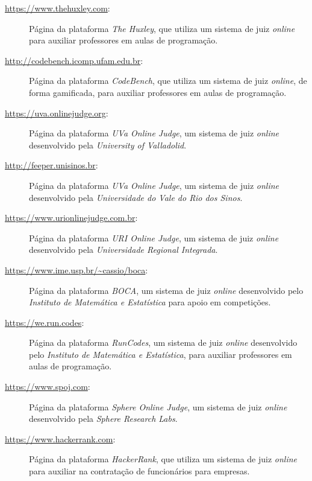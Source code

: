 \begin{description}
\label{link:the_huxley}
  \item[\url{https://www.thehuxley.com}:]  Página da plataforma \emph{The Huxley}, 
    que utiliza um sistema de juiz \emph{online} para auxiliar professores em aulas de programação.

\label{link:code_bench}
  \item[\url{http://codebench.icomp.ufam.edu.br}:]  Página da plataforma \emph{CodeBench}, 
    que utiliza um sistema de juiz \emph{online}, de forma gamificada, para auxiliar professores em aulas de programação.

\label{link:uva_judge}
  \item[\url{https://uva.onlinejudge.org}:] Página da plataforma \emph{UVa Online Judge}, um sistema
    de juiz \emph{online} desenvolvido pela \emph{University of Valladolid}.

\label{link:feeper}
  \item[\url{http://feeper.unisinos.br}:] Página da plataforma \emph{UVa Online Judge}, um sistema
    de juiz \emph{online} desenvolvido pela \emph{Universidade do Vale do Rio dos Sinos}.

\label{link:uri_judge}
  \item[\url{https://www.urionlinejudge.com.br}:] Página da plataforma \emph{URI Online Judge}, um sistema
    de juiz \emph{online} desenvolvido pela \emph{Universidade Regional Integrada}.

\label{link:boca}
  \item[\url{https://www.ime.usp.br/~cassio/boca}:] Página da plataforma \emph{BOCA}, um sistema
    de juiz \emph{online} desenvolvido pelo \emph{Instituto de Matemática e Estatística} para apoio 
    em competições.

\label{link:we_run_codes}
  \item[\url{https://we.run.codes}:] Página da plataforma \emph{RunCodes}, um sistema
    de juiz \emph{online} desenvolvido pelo \emph{Instituto de Matemática e Estatística}, 
    para auxiliar professores em aulas de programação.

\label{link:sphere_judge}
  \item[\url{https://www.spoj.com}:] Página da plataforma \emph{Sphere Online Judge}, um sistema
    de juiz \emph{online} desenvolvido pela \emph{Sphere Research Labs}.

\label{link:hacker_rank}
  \item[\url{https://www.hackerrank.com}:]  Página da plataforma \emph{HackerRank}, 
    que utiliza um sistema de juiz \emph{online} para auxiliar na contratação de funcionários 
    para empresas.


\end{description}
